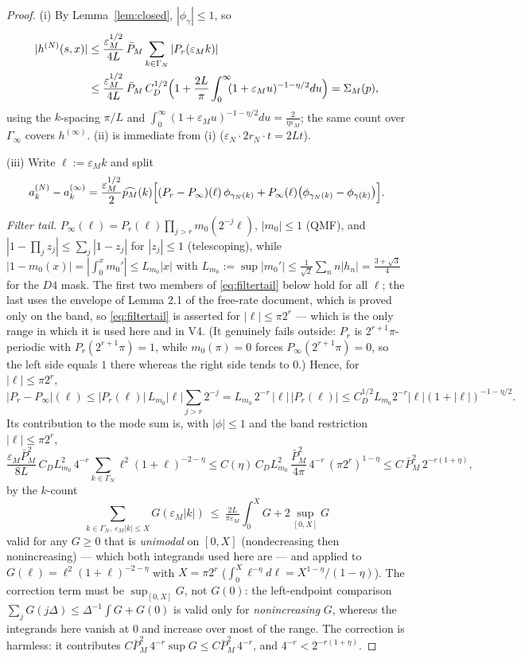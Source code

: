 \documentclass[11pt,a4paper]{article}
\theoremstyle{plain}
\theoremstyle{definition}
\newcommand{\eps}{\varepsilon}
\begin{document}
\begin{proof}
(i) By Lemma~\ref{lem:closed}, $|\phi_\gamma|\le1$, so
\[
 \begin{split}
 |h^{(N)}(s,x)|&\le\frac{\eps_M^{1/2}}{4L}\,\bar P_M
 \sum_{k\in\Gamma_N}|P_r(\eps_Mk)|\\
 &\le\frac{\eps_M^{1/2}}{4L}\,\bar P_M\,C_D^{1/2}
 \Bigl(1+\frac{2L}\pi\int_0^\infty\!\!(1+\eps_Mu)^{-1-\eta/2}du\Bigr)
 =\Sigma_M(p),
 \end{split}
\]
using the $k$-spacing $\pi/L$ and $\int_0^\infty(1+\eps_Mu)^{-1-\eta/2}du
=\tfrac2{\eta\eps_M}$; the same count over $\Gamma_\infty$ covers
$h^{(\infty)}$. (ii) is immediate from (i) ($\eps_N\cdot2r_N\cdot t=2Lt$).

(iii) Write $\ell:=\eps_Mk$ and split
\[
 a^{(N)}_k-a^{(\infty)}_k=\frac{\eps_M^{1/2}}2\widehat{p_M}(k)
 \Bigl[(P_r-P_\infty)(\ell)\,\phi_{\gamma_N(k)}
 +P_\infty(\ell)\bigl(\phi_{\gamma_N(k)}-\phi_{\gamma(k)}\bigr)\Bigr].
\]

\emph{Filter tail.} $P_\infty(\ell)=P_r(\ell)\prod_{j>r}m_0(2^{-j}\ell)$,
$|m_0|\le1$ (QMF), and $|1-\prod_jz_j|\le\sum_j|1-z_j|$ for $|z_j|\le1$
(telescoping), while $|1-m_0(x)|=|\int_0^xm_0'|\le L_{m_0}|x|$ with
$L_{m_0}:=\sup|m_0'|\le\tfrac1{\sqrt2}\sum_n n|h_n|=\tfrac{3+\sqrt3}4$ for
the $D4$ mask. The first two members of \eqref{eq:filtertail} below hold for all
$\ell$; the last uses the envelope of Lemma 2.1 of the free-rate document, which is
proved only on the band, so \eqref{eq:filtertail} is asserted for
$|\ell|\le\pi2^r$ --- which is the only range in which it is used here and in V4. (It
genuinely fails outside: $P_r$ is $2^{r+1}\pi$-periodic with $P_r(2^{r+1}\pi)=1$, while
$m_0(\pi)=0$ forces $P_\infty(2^{r+1}\pi)=0$, so the left side equals $1$ there whereas
the right side tends to $0$.) Hence, for $|\ell|\le\pi2^r$,
\begin{equation}
 |P_r-P_\infty|(\ell)\le|P_r(\ell)|\,L_{m_0}|\ell|\sum_{j>r}2^{-j}
 =L_{m_0}\,2^{-r}\,|\ell|\,|P_r(\ell)|
 \le C_D^{1/2}L_{m_0}2^{-r}|\ell|(1+|\ell|)^{-1-\eta/2}.
 \label{eq:filtertail}
\end{equation}
Its contribution to the mode sum is, with $|\phi|\le1$ and the band
restriction $|\ell|\le\pi2^r$,
\[
 \frac{\eps_M\bar P_M^2}{8L}\,C_DL_{m_0}^2\,4^{-r}
 \sum_{k\in\Gamma_N}\ell^2(1+\ell)^{-2-\eta}
 \le C(\eta)\,C_DL_{m_0}^2\,\frac{\bar P_M^2}{4\pi}\,
 4^{-r}\,(\pi2^r)^{1-\eta}
 \le C\,\bar P_M^2\,2^{-r(1+\eta)},
\]
by the $k$-count
\[
 \sum_{k\in\Gamma_N,\ \eps_M|k|\le X}G(\eps_M|k|)\ \le\
 \tfrac{2L}{\pi\eps_M}\int_0^XG+2\sup_{[0,X]}G
\]
valid for any $G\ge0$ that is \emph{unimodal} on $[0,X]$ (nondecreasing then
nonincreasing) --- which both integrands used here are --- and applied to
$G(\ell)=\ell^2(1+\ell)^{-2-\eta}$ with $X=\pi2^r$
($\int_0^X\ell^{-\eta}d\ell=X^{1-\eta}/(1-\eta)$). The correction term must be
$\sup_{[0,X]}G$, not $G(0)$: the left-endpoint comparison
$\sum_jG(j\Delta)\le\Delta^{-1}\!\int G+G(0)$ is valid only for \emph{nonincreasing}
$G$, whereas the integrands here vanish at $0$ and increase over most of the range.
The correction is harmless: it contributes
$C\bar P_M^2\,4^{-r}\sup G\le C\bar P_M^2\,4^{-r}$, and $4^{-r}<2^{-r(1+\eta)}$.


\end{proof}
\end{document}

